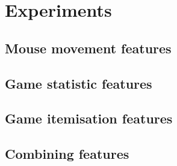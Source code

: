 \documentclass[Report.tex]{subfiles}
\begin{document}
\section{Experiments}

\subsection{Mouse movement features}

\subsection{Game statistic features}

\subsection{Game itemisation features}

\subsection{Combining features}
\end{document}
